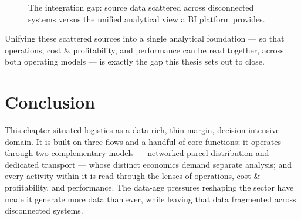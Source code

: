 \begin{figure}[H]
\centering
{}
\caption{The integration gap: source data scattered across disconnected systems versus the unified
analytical view a BI platform provides.}
\label{fig:ch2-integration-gap}
\end{figure}

\noindent Unifying these scattered sources into a single analytical foundation --- so that operations,
cost \& profitability, and performance can be read together, across both operating models --- is exactly
the gap this thesis sets out to close.

\section*{Conclusion}

This chapter situated logistics as a data-rich, thin-margin, decision-intensive domain. It is built on
three flows and a handful of core functions; it operates through two complementary models --- networked
parcel distribution and dedicated transport --- whose distinct economics demand separate analysis; and
every activity within it is read through the lenses of operations, cost \& profitability, and
performance. The data-age pressures reshaping the sector have made it generate more data than ever,
while leaving that data fragmented across disconnected systems.


